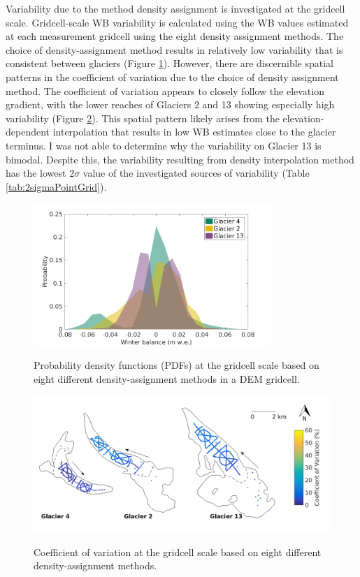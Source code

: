 \documentclass{sfuthesis}
\begin{document}
Variability due to the method density assignment is investigated at the gridcell scale. Gridcell-scale WB variability is calculated using the WB values estimated at each measurement gridcell using the eight density assignment methods. The choice of density-assignment method results in relatively low variability that is consistent between glaciers (Figure \ref{fig:SWEvar_Density_hist}). However, there are discernible spatial patterns in the coefficient of variation due to the choice of density assignment method. The coefficient of variation appears to closely follow the elevation gradient, with the lower reaches of Glaciers 2 and 13 showing especially high variability (Figure \ref{fig:SWEvar_Density_map}). This spatial pattern likely arises from the elevation-dependent interpolation that results in low WB estimates close to the glacier terminus. I was not able to determine why the variability on Glacier 13 is bimodal. Despite this, the variability resulting from density interpolation method has the lowest $2\sigma$ value of the investigated sources of variability (Table \ref{tab:2sigmaPointGrid}).

\begin{figure}[H]
	\centering
	\includegraphics[width =0.8\textwidth]{SWEvarDensityHIST.png}\\
	\caption{Probability density functions (PDFs) at the gridcell scale based on eight different density-assignment methods in a DEM gridcell.}
	\label{fig:SWEvar_Density_hist}
\end{figure}

\begin{figure}[H]
	\centering
	\includegraphics[width =\textwidth]{Map_cellstd_density.png}\\
	\caption{Coefficient of variation at the gridcell scale based on eight different density-assignment methods.}
	\label{fig:SWEvar_Density_map}
\end{figure}
\end{document}
